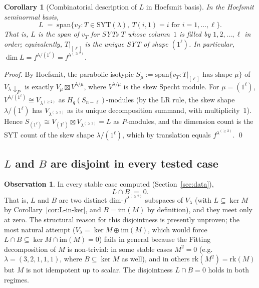 \documentclass[11pt]{article}
\newtheorem{corollary}[theorem]{Corollary}
\theoremstyle{definition}
\newtheorem{observation}[theorem]{Observation}
\begin{document}
\begin{corollary}[Combinatorial description of $L$ in Hoefsmit basis]
\label{cor:L-Hoefsmit}
In the Hoefsmit seminormal basis,
\[
   L \;=\; \mathrm{span}\!\bigl\{ v_T : T \in \mathrm{SYT}(\lambda),\
      T(i, 1) = i \text{ for } i = 1, \ldots, \ell \bigr\}.
\]
That is, $L$ is the span of $v_T$ for SYTs $T$ whose column~$1$ is
filled by $1, 2, \ldots, \ell$ in order; equivalently, $T|_{[\ell]}$
is the unique SYT of shape $(1^\ell)$. In particular,
$\dim L = f^{\lambda / (1^\ell)} = f^{\lambda^{(\ge 2)}}$.
\end{corollary}

\begin{proof}
By Hoefsmit, the parabolic isotypic
$S_\mu := \mathrm{span}\{v_T : T|_{[\ell]} \text{ has shape } \mu\}$
of $V_\lambda \!\downarrow_P$ is exactly $V_\mu \boxtimes V^{\lambda/\mu}$,
where $V^{\lambda/\mu}$ is the skew Specht module. For $\mu = (1^\ell)$,
$V^{\lambda/(1^\ell)} \cong V_{\lambda^{(\ge 2)}}$ as $H_q(S_{n-\ell})$-modules
(by the LR rule, the skew shape $\lambda/(1^\ell)$ has $V_{\lambda^{(\ge 2)}}$
as its unique decomposition summand, with multiplicity~$1$). Hence
$S_{(1^\ell)} \cong V_{(1^\ell)} \boxtimes V_{\lambda^{(\ge 2)}} = L$ as
$P$-modules, and the dimension count is the SYT count of the skew
shape $\lambda / (1^\ell)$, which by translation equals
$f^{\lambda^{(\ge 2)}}$. \qed
\end{proof}

\subsection{$L$ and $B$ are disjoint in every tested case}

\begin{observation}\label{obs:disjoint}
In every stable case computed (Section~\ref{sec:data}),
\[
   L \cap B \;=\; 0.
\]
That is, $L$ and $B$ are two distinct dim-$f^{\lambda^{(\ge 2)}}$
subspaces of $V_\lambda$ (with $L \subseteq \ker M$ by
Corollary~\ref{cor:L-in-ker}, and $B = \mathrm{im}(M)$ by definition),
and they meet only at zero. The structural reason for this disjointness
is presently unproven; the most natural attempt
($V_\lambda = \ker M \oplus \mathrm{im}(M)$, which would force
$L \cap B \subseteq \ker M \cap \mathrm{im}(M) = 0$) fails in general
because the Fitting decomposition of $M$ is non-trivial: in some
stable cases $M^2 = 0$ (e.g.\ $\lambda = (3,2,1,1,1)$, where $B
\subseteq \ker M$ as well), and in others $\mathrm{rk}(M^2) =
\mathrm{rk}(M)$ but $M$ is not idempotent up to scalar. The
disjointness $L \cap B = 0$ holds in both regimes.
\end{observation}
\end{document}

